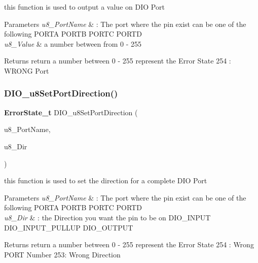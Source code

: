 this function is used to output a value on D\+IO Port 


\begin{DoxyParams}{Parameters}
{\em u8\+\_\+\+Port\+Name} & \+: The port where the pin exist can be one of the following P\+O\+R\+TA P\+O\+R\+TB P\+O\+R\+TC P\+O\+R\+TD \\
\hline
{\em u8\+\_\+\+Value} & a number between from 0 -\/ 255 \\
\hline
\end{DoxyParams}
\begin{DoxyReturn}{Returns}
return a number between 0 -\/ 255 represent the Error State 254 \+: W\+R\+O\+NG Port 
\end{DoxyReturn}
\mbox{\label{_d_i_o_8c_a19142acb7bbde8f2144a48be4bc38a3f}} 
\subsubsection{D\+I\+O\+\_\+u8\+Set\+Port\+Direction()}
{\footnotesize\ttfamily \textbf{ Error\+State\+\_\+t} D\+I\+O\+\_\+u8\+Set\+Port\+Direction (\begin{DoxyParamCaption}\item[{\textbf{ D\+I\+O\+Port\+\_\+t}}]{u8\+\_\+\+Port\+Name,  }\item[{\textbf{ D\+I\+O\+Dir\+\_\+t}}]{u8\+\_\+\+Dir }\end{DoxyParamCaption})}



this function is used to set the direction for a complete D\+IO Port 


\begin{DoxyParams}{Parameters}
{\em u8\+\_\+\+Port\+Name} & \+: The port where the pin exist can be one of the following P\+O\+R\+TA P\+O\+R\+TB P\+O\+R\+TC P\+O\+R\+TD \\
\hline
{\em u8\+\_\+\+Dir} & \+: the Direction you want the pin to be on D\+I\+O\+\_\+\+I\+N\+P\+UT D\+I\+O\+\_\+\+I\+N\+P\+U\+T\+\_\+\+P\+U\+L\+L\+UP D\+I\+O\+\_\+\+O\+U\+T\+P\+UT \\
\hline
\end{DoxyParams}
\begin{DoxyReturn}{Returns}
return a number between 0 -\/ 255 represent the Error State 254 \+: Wrong P\+O\+RT Number 253\+: Wrong Direction 
\end{DoxyReturn}
\mbox{\label{_d_i_o_8c_a8caffe2a4db322f3e6de4c4b55b9a842}} 
